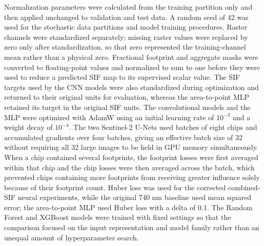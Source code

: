 Normalization parameters were calculated from the training partition only and then applied unchanged to validation and test data. A random seed of 42 was used for the stochastic data partitions and model training procedures. Raster channels were standardized separately; missing raster values were replaced by zero only after standardization, so that zero represented the training-channel mean rather than a physical zero. Fractional footprint and aggregate masks were converted to floating-point values and normalized to sum to one before they were used to reduce a predicted SIF map to its supervised scalar value. The SIF targets used by the CNN models were also standardized during optimization and returned to their original units for evaluation, whereas the area-to-point MLP retained its target in the original SIF units. The convolutional models and the MLP were optimized with AdamW using an initial learning rate of $10^{-3}$ and a weight decay of $10^{-4}$. The two Sentinel-2 U-Nets used batches of eight chips and accumulated gradients over four batches, giving an effective batch size of 32 without requiring all 32 large images to be held in GPU memory simultaneously. When a chip contained several footprints, the footprint losses were first averaged within that chip and the chip losses were then averaged across the batch, which prevented chips containing more footprints from receiving greater influence solely because of their footprint count. Huber loss was used for the corrected combined-SIF neural experiments, while the original 740 nm baseline used mean squared error; the area-to-point MLP used Huber loss with a delta of 0.1. The Random Forest and XGBoost models were trained with fixed settings so that the comparison focused on the input representation and model family rather than an unequal amount of hyperparameter search.

